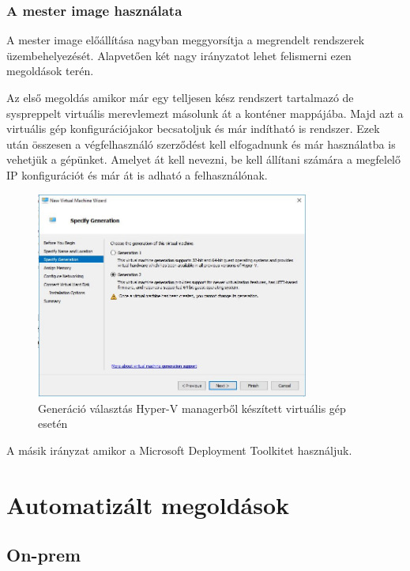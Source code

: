\documentclass[12pt,oneside,justify]{book}
\begin{document}
\subsubsection{A mester image használata}

A mester image előállítása nagyban meggyorsítja a megrendelt rendszerek üzembehelyezését. Alapvetően két nagy irányzatot lehet felismerni ezen megoldások terén. 

Az első megoldás amikor már egy telljesen kész rendszert tartalmazó de syspreppelt virtuális merevlemezt másolunk át a konténer mappájába. Majd azt a virtuális gép konfigurációjakor becsatoljuk és már indítható is rendszer. Ezek után összesen a végfelhasználó szerződést kell elfogadnunk és már használatba is vehetjük a gépünket. Amelyet át kell nevezni, be kell állítani számára a megfelelő IP konfigurációt és már át is adható a felhasználónak. 

 
\begin{figure}[h]
\centering
\includegraphics[width=0.8\textwidth]{generation_selection}
\caption{Generáció választás Hyper-V managerből készített virtuális gép esetén}
\label{fig:gen_selection}
\end{figure}


A másik irányzat amikor a Microsoft Deployment Toolkitet használjuk.

\section{Automatizált megoldások}


\subsection{On-prem}
\end{document}
